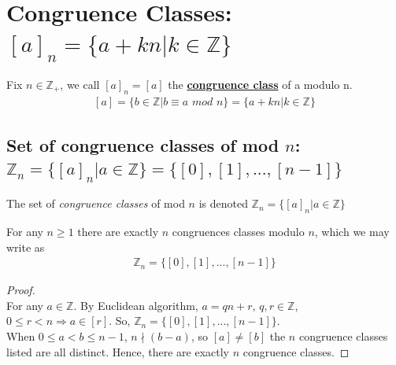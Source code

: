 \documentclass[11pt]{elegantbook}
\begin{document}
\section{Congruence Classes: $[a]_n=\{a+kn|k\in\mathbb{Z} \}$}
Fix $n\in\mathbb{Z}_+$, we call $[a]_{n}=[a]$ the \underline{\textbf{congruence class}} of a modulo n.
\begin{equation}
    \begin{aligned}
        [a] = \{b \in \mathbb{Z}|b\equiv a \textit{ mod }n\}=\{a+kn|k\in\mathbb{Z} \}
    \end{aligned}
    \nonumber
\end{equation}

\subsection{Set of congruence classes of mod $n$: $\mathbb{Z}_n = \{[a]_n|a \in \mathbb{Z}\}=\{[0],[1],...,[n-1]\}$}
The set of \textit{congruence classes} of mod $n$ is denoted $\mathbb{Z}_n = \{[a]_n|a \in \mathbb{Z}\}$
\begin{proposition}[Proposition 1.5.2.]
For any $n\geq 1$ there are exactly $n$ congruences classes modulo $n$, which we may write as
\begin{equation}
    \begin{aligned}
        \mathbb{Z}_n = \{[0],[1],...,[n-1]\}
    \end{aligned}
    \nonumber
\end{equation}
\end{proposition}
\begin{proof}
\quad\\
For any $a\in\mathbb{Z}$. By Euclidean algorithm, $a=qn+r$, $q,r\in\mathbb{Z}$, $0\leq r<n\Rightarrow a\in[r]$. So, $\mathbb{Z}_n = \{[0],[1],...,[n-1]\}$.\\
When $0\leq a<b\leq n-1$, $n\nmid(b-a)$, so $[a]\neq [b]$ the $n$ congruence classes listed are all distinct. Hence, there are exactly $n$ congruence classes.
\end{proof}
\end{document}
